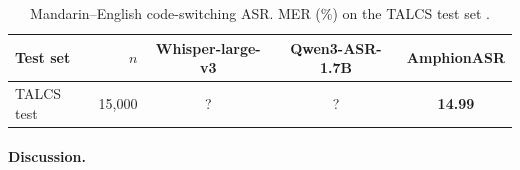 \begin{table}[t]
  \caption{Mandarin--English code-switching ASR. MER (\%) on the
    TALCS test set \cite{li2022talcs}.}
  \label{tab:asr_cs}
  \centering
  \small
  \begin{tabular}{lrccc}
    \toprule
    Test set & $n$ & Whisper-large-v3 & Qwen3-ASR-1.7B & \textbf{AmphionASR} \\
    \midrule
    TALCS test                         & 15{,}000 & ? & ? & \textbf{14.99} \\
    \bottomrule
  \end{tabular}
\end{table}

\paragraph{Discussion.}
